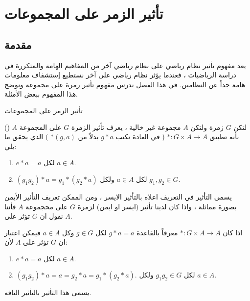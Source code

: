 \chapter{تأثير الزمر على المجموعات}

\section*{مقدمة}
يعد مفهوم تأثير نظام رياضي على نظام رياضي آخر من المفاهيم الهامة والمتكررة في دراسة الرياضيات ، فعندما يؤثر نظام رياضي على آخر نستطيع إستشفاف معلومات هامة جداً عن النظامين. في هذا الفصل ندرس مفهوم تأثير زمرة على مجموعة ونوضح هذا المفهوم ببعض الأمثلة.



\begin{definition}{تأثير الزمر على المجموعات}{\cite{ref3}}
	لتكن $G$ زمرة ولتكن $A$ مجموعة غير خالية ، يعرف تأثير الزمرة $G$ على المجموعة $A$
	\linebreak()
	بأنه تطبيق 
	$* : G \times A \to A$ ( في العادة نكتب $g*a$ بدلاً من $*(g, a)$ ) الذي يحقق ما يلي:
	\begin{enumerate}
		\item $e * a = a$ لكل $a\in A$.
		\item $(g_1g_2)*a = g_1 * (g_2 * a)$ لكل $a\in A$ ولكل $g_1,g_2 \in G$.
	\end{enumerate} 
\end{definition}

\begin{note}
	يسمى التأثير  في التعريف اعلاه بالتأثير الايسر ، ومن الممكن تعريف التأثير الأيمن بصورة مماثلة ، واذا كان لدينا تأثير (ايسر او ايمن) لزمرة $G$ على محجموعة $A$ فأننا نقول ان $G$ تؤثر على $A$.
\end{note}

\begin{example}
اذا كان $*:G\times A \to A$ معرفاً بالقاعدة 
$g*a = a$ لكل $g\in G$ وكل $a\in A$ فيمكن اعتبار ان $G$ تؤثر على $A$ لأن:
\begin{enumerate}
	\item $e*a=a$ لكل $a\in A$.
	\item $(g_1g_2)*a=a=g_2*a=g_1*(g_2*a)$. لكل $g_1g_2\in G$ ولكل $a\in A$.
\end{enumerate}	
يسمى هذا التأثير بالتأثير التافه.
\end{example}

